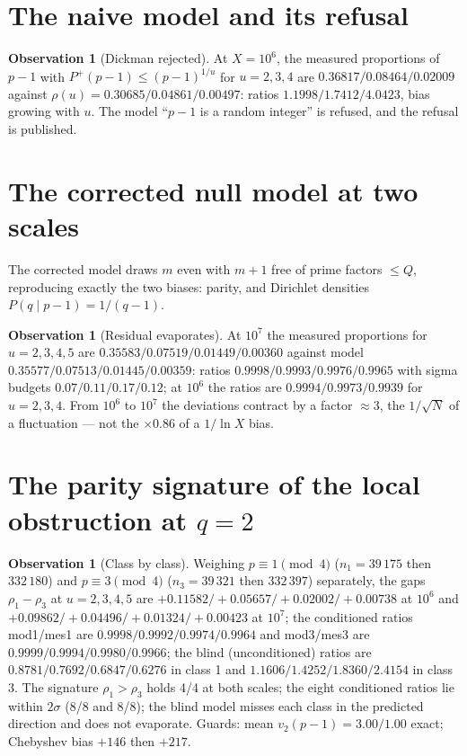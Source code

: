 \documentclass[11pt,a4paper]{article}
\theoremstyle{definition}
\newtheorem{observation}[theorem]{Observation}
\begin{document}
\section{The naive model and its refusal}
\begin{observation}[Dickman rejected]
At $X=10^6$, the measured proportions of $p-1$ with $P^+(p-1)\le(p-1)^{1/u}$
for $u=2,3,4$ are $0.36817/0.08464/0.02009$ against
$\rho(u)=0.30685/0.04861/0.00497$: ratios $1.1998/1.7412/4.0423$, bias
growing with $u$. The model ``$p-1$ is a random integer'' is refused, and the
refusal is published.
\end{observation}

\section{The corrected null model at two scales}
The corrected model draws $m$ even with $m+1$ free of prime factors $\le Q$,
reproducing exactly the two biases: parity, and Dirichlet densities
$P(q\mid p-1)=1/(q-1)$.
\begin{observation}[Residual evaporates]
At $10^7$ the measured proportions for $u=2,3,4,5$ are
$0.35583/0.07519/0.01449/0.00360$ against model
$0.35577/0.07513/0.01445/0.00359$: ratios $0.9998/0.9993/0.9976/0.9965$ with
sigma budgets $0.07/0.11/0.17/0.12$; at $10^6$ the ratios are
$0.9994/0.9973/0.9939$ for $u=2,3,4$. From $10^6$ to $10^7$ the deviations
contract by a factor $\approx 3$, the $1/\sqrt N$ of a fluctuation --- not
the $\times 0.86$ of a $1/\ln X$ bias.
\end{observation}

\section{The parity signature of the local obstruction at $q=2$}
\begin{observation}[Class by class]
Weighing $p\equiv1\pmod4$ ($n_1=39\,175$ then $332\,180$) and
$p\equiv3\pmod4$ ($n_3=39\,321$ then $332\,397$) separately, the gaps
$\rho_1-\rho_3$ at $u=2,3,4,5$ are
$+0.11582/+0.05657/+0.02002/+0.00738$ at $10^6$ and
$+0.09862/+0.04496/+0.01324/+0.00423$ at $10^7$; the conditioned ratios
mod1/mes1 are $0.9998/0.9992/0.9974/0.9964$ and mod3/mes3 are
$0.9999/0.9994/0.9980/0.9966$; the blind (unconditioned) ratios are
$0.8781/0.7692/0.6847/0.6276$ in class 1 and
$1.1606/1.4252/1.8360/2.4154$ in class 3. The signature $\rho_1>\rho_3$
holds 4/4 at both scales; the eight conditioned ratios lie within $2\sigma$
(8/8 and 8/8); the blind model misses each class in the predicted direction
and does not evaporate. Guards: mean $v_2(p-1)=3.00/1.00$ exact; Chebyshev
bias $+146$ then $+217$.
\end{observation}
\end{document}

